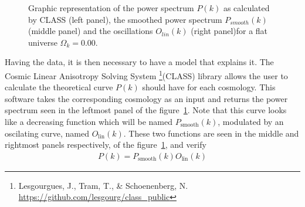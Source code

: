 \begin{figure}[t]
	\centering
	\caption[Plot of the template power spectrum, its smooth component and the pure BAO]{Graphic representation of the power spectrum $P(k)$ as calculated by CLASS (left panel), the smoothed power spectrum $P_{smooth}(k)$ (middle panel) and the oscillations $O_{lin}(k)$ (right panel)for a flat universe $\Omega_k = 0.00$.} \label{fig:PkOlPsm} \end{figure} Having the data, it is then necessary to have a model that explains it. The Cosmic Linear Anisotropy Solving System \footnote{Lesgourgues, J., Tram, T., \& Schoenenberg, N. \url{https://github.com/lesgourg/class_public}}(CLASS)  library allows the user to calculate the theoretical curve $P(k)$ should have for each cosmology. This software takes the corresponding cosmology as an input and returns the power spectrum seen in the leftmost panel of the figure~\ref{fig:PkOlPsm}. Note that this curve looks like a decreasing function which will be named $P_{\text{smooth}}(k)$, modulated by an oscilating curve, named $O_{\text{lin}}(k)$. These two functions are seen in the middle and rightmost panels respectively, of the figure~\ref{fig:PkOlPsm}, and verify \begin{align} P(k) = P_{\text{smooth}}(k) O_{\text{lin}}(k)
	\label{eq:pk-components}
\end{align}
